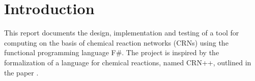 \section{Introduction}
This report documents the design, implementation and testing of a tool for computing on the basis of chemical reaction networks (CRNs) using the functional programming language F\#. The project is inspired by the formalization of a language for chemical reactions, named CRN++, outlined in the paper \cite{soloveichik2018a}. 